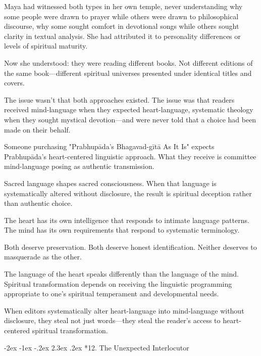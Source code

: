 \documentclass[12pt,twoside]{book}
\makeatletter
\def\cleardoublepage{\clearpage\if@twoside \ifodd\c@page\else\hbox{}\thispagestyle{empty}\newpage\if@twocolumn\hbox{}\newpage\fi\fi\fi}
\renewcommand\section{\@startsection{section}{1}{\z@}%
{-2ex \@plus -1ex \@minus -.2ex}%
{2.3ex \@plus.2ex}%
{\normalfont\Large\bfseries}}
\makeatother
\begin{document}
Maya had witnessed both types in her own temple, never understanding why some people were drawn to prayer while others were drawn to philosophical discourse, why some sought comfort in devotional songs while others sought clarity in textual analysis. She had attributed it to personality differences or levels of spiritual maturity.

Now she understood: they were reading different books. Not different editions of the same book—different spiritual universes presented under identical titles and covers.

The issue wasn't that both approaches existed. The issue was that readers received mind-language when they expected heart-language, systematic theology when they sought mystical devotion—and were never told that a choice had been made on their behalf.

Someone purchasing "Prabhupāda's Bhagavad-gītā As It Is" expects Prabhupāda's heart-centered linguistic approach. What they receive is committee mind-language posing as authentic transmission.

Sacred language shapes sacred consciousness. When that language is systematically altered without disclosure, the result is spiritual deception rather than authentic choice.

The heart has its own intelligence that responds to intimate language patterns. The mind has its own requirements that respond to systematic terminology.

Both deserve preservation. Both deserve honest identification. Neither deserves to masquerade as the other.

The language of the heart speaks differently than the language of the mind. Spiritual transformation depends on receiving the linguistic programming appropriate to one's spiritual temperament and developmental needs.

When editors systematically alter heart-language into mind-language without disclosure, they steal not just words—they steal the reader's access to heart-centered spiritual transformation.

\cleardoublepage
\vspace*{0.20\textheight}
\section*{12. The Unexpected Interlocutor}
\thispagestyle{chapterpage}
\end{document}
